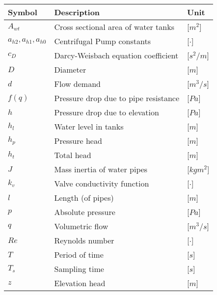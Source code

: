 \begin{tabular}{l l l} 
	\textbf{Symbol}		&	\textbf{Description}								& \hspace{25mm}\textbf{Unit}	\\\hline

	$A_{wt}$ 			&	Cross sectional area of water tanks	 				& \hspace{25mm}[$m^2$]\\
	$a_{h2},a_{h1},a_{h0}$ &	Centrifugal Pump constants	 								& \hspace{25mm}[$\cdot$]\\
	$c_D$				&	Darcy-Weisbach equation coefficient	 				& \hspace{25mm}[$s^2/m$]\\
	$D$					&	Diameter 											& \hspace{25mm}[$m$]\\
	$d$					&	Flow demand	 										& \hspace{25mm}[$m^3/s$]\\
	$f(q)$				&	Pressure drop due to pipe resistance				& \hspace{25mm}[$Pa$]\\
	$h$					&	Pressure drop due to elevation					    & \hspace{25mm}[$Pa$]\\
	$h_{l}$				&	Water level in tanks							    & \hspace{25mm}[$m$]\\
	$h_p$				&	Pressure head									    & \hspace{25mm}[$m$]\\
	$h_t$				&	Total head									        & \hspace{25mm}[$m$]\\
	$J$					&	Mass inertia of water pipes							& \hspace{25mm}[$kgm^2$]\\
	$k_v$				&	Valve conductivity function							& \hspace{25mm}[$\cdot$]\\
	$l$					&	Length (of pipes)									& \hspace{25mm}[$m$]\\
	$p$					&	Absolute pressure									& \hspace{25mm}[$Pa$]\\
	$q$					&	Volumetric flow									    & \hspace{25mm}[$m^3/s$]\\
	$Re$				&	Reynolds number								        & \hspace{25mm}[$\cdot$]\\
	$T$					&	Period of time								        & \hspace{25mm}[$s$]\\
	$T_s$				&	Sampling time								        & \hspace{25mm}[$s$]\\
	$z$					&	Elevation head									    & \hspace{25mm}[$m$]\\


\end{tabular}
